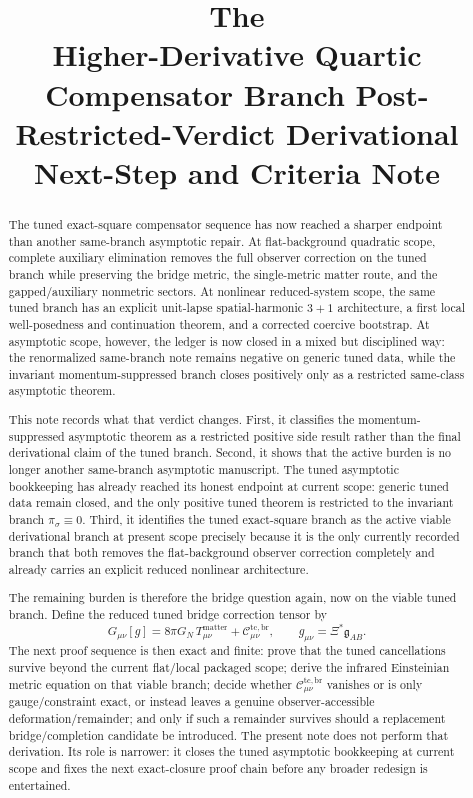 \documentclass[11pt]{article}
\title{\textbf{The \TheoryName{}}\\[0.4em]
\large Higher-Derivative Quartic Compensator Branch Post-Restricted-Verdict Derivational Next-Step and Criteria Note}
\author{}
\date{}
\newcommand{\BridgeMetric}{\mathfrak{g}}
\begin{document}
\maketitle

\begin{abstract}
The tuned exact-square compensator sequence has now reached a sharper endpoint than another same-branch asymptotic repair. At flat-background quadratic scope, complete auxiliary elimination removes the full observer correction on the tuned branch while preserving the bridge metric, the single-metric matter route, and the gapped/auxiliary nonmetric sectors. At nonlinear reduced-system scope, the same tuned branch has an explicit unit-lapse spatial-harmonic \(3+1\) architecture, a first local well-posedness and continuation theorem, and a corrected coercive bootstrap. At asymptotic scope, however, the ledger is now closed in a mixed but disciplined way: the renormalized same-branch note remains negative on generic tuned data, while the invariant momentum-suppressed branch closes positively only as a restricted same-class asymptotic theorem.

This note records what that verdict changes. First, it classifies the momentum-suppressed asymptotic theorem as a restricted positive side result rather than the final derivational claim of the tuned branch. Second, it shows that the active burden is no longer another same-branch asymptotic manuscript. The tuned asymptotic bookkeeping has already reached its honest endpoint at current scope: generic tuned data remain closed, and the only positive tuned theorem is restricted to the invariant branch \(\pi_\sigma\equiv 0\). Third, it identifies the tuned exact-square branch as the active viable derivational branch at present scope precisely because it is the only currently recorded branch that both removes the flat-background observer correction completely and already carries an explicit reduced nonlinear architecture.

The remaining burden is therefore the bridge question again, now on the viable tuned branch. Define the reduced tuned bridge correction tensor by
\[
G_{\mu\nu}[g]
=
8\pi G_N\,T_{\mu\nu}^{\mathrm{matter}}
+ \mathcal C_{\mu\nu}^{\mathrm{tc,br}},
\qquad
g_{\mu\nu}=\Xi^\ast\BridgeMetric_{AB}.
\]
The next proof sequence is then exact and finite: prove that the tuned cancellations survive beyond the current flat/local packaged scope; derive the infrared Einsteinian metric equation on that viable branch; decide whether \(\mathcal C_{\mu\nu}^{\mathrm{tc,br}}\) vanishes or is only gauge/constraint exact, or instead leaves a genuine observer-accessible deformation/remainder; and only if such a remainder survives should a replacement bridge/completion candidate be introduced. The present note does not perform that derivation. Its role is narrower: it closes the tuned asymptotic bookkeeping at current scope and fixes the next exact-closure proof chain before any broader redesign is entertained.
\end{abstract}
\end{document}
